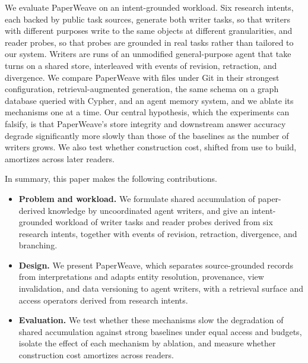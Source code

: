 \documentclass[sigconf,review,anonymous]{acmart}
\begin{document}
We evaluate PaperWeave on an intent-grounded workload. Six research intents,
each backed by public task sources, generate both writer tasks, so that writers
with different purposes write to the same objects at different granularities,
and reader probes, so that probes are grounded in real tasks rather than
tailored to our system. Writers are runs of an unmodified general-purpose agent
that take turns on a shared store, interleaved with events of revision,
retraction, and divergence. We compare PaperWeave with files under Git in their
strongest configuration, retrieval-augmented generation, the same schema on a
graph database queried with Cypher, and an agent memory system, and we ablate
its mechanisms one at a time. Our central hypothesis, which the experiments can
falsify, is that PaperWeave's store integrity and downstream answer accuracy
degrade significantly more slowly than those of the baselines as the number of
writers grows. We also test whether construction cost, shifted from use to
build, amortizes across later readers.

In summary, this paper makes the following contributions.
\begin{itemize}
  \item \textbf{Problem and workload.} We formulate shared accumulation of
    paper-derived knowledge by uncoordinated agent writers, and give an
    intent-grounded workload of writer tasks and reader probes derived from six
    research intents, together with events of revision, retraction,
    divergence, and branching.
  \item \textbf{Design.} We present PaperWeave, which separates
    source-grounded records from interpretations and adapts entity resolution,
    provenance, view invalidation, and data versioning to agent writers, with a
    retrieval surface and access operators derived from research intents.
  \item \textbf{Evaluation.} We test whether these mechanisms slow the
    degradation of shared accumulation against strong baselines under equal
    access and budgets, isolate the effect of each mechanism by ablation, and
    measure whether construction cost amortizes across readers.
\end{itemize}

\end{document}
